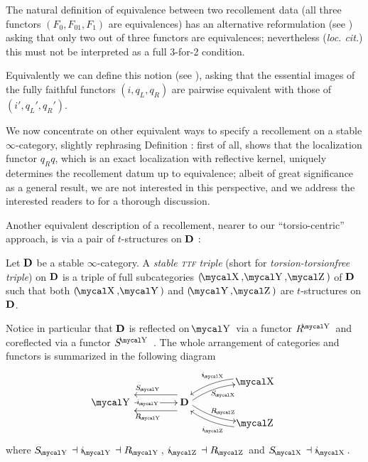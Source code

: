 \begin{remark}\label{equiv.of.reco}
The natural definition of equivalence between two recollement data (all three functors $(F_0, F_{01}, F_1)$ are equivalences) has an alternative reformulation (see \cite[ \textbf{2.5}]{parshall1988derived}) asking that only two out of three functors are equivalences; nevertheless (\emph{loc. cit.}) this must not be interpreted as a full 3-for-2 condition.

Equivalently we can define this notion (see \cite[\S \textbf{1.7}]{hugel2011recollements}), asking that the essential images of the fully faithful functors $(i, q_L,q_R)$ are pairwise equivalent with those of $(i', q_L', q_R')$.
\end{remark}
We now concentrate on other equivalent ways to specify a recollement on a stable $\infty$\hyp{}category, slightly rephrasing Definition : first of all, \cite[ \textbf{4.13.1}]{Hol} shows that the localization functor $q_Rq$, which is an exact localization with reflective kernel, uniquely determines the recollement datum up to equivalence; albeit of great significance as a general result, we are not interested in this perspective, and we address the interested readers to \cite{Hol} for a thorough discussion. 

Another equivalent description of a recollement, nearer to our ``torsio\hyp{}centric'' approach, is via a pair of $t$\hyp{}structures on $\textbf{D}$ \cite{ttftriples}:
\begin{definition}
Let $\textbf{D}$ be a stable $\infty$\hyp{}category. A \emph{stable \textsc{ttf} triple} (short for \emph{torsion\hyp{}torsionfree triple}) on $\textbf{D}$ is a triple of full subcategories $(\mcal{X}, \mcal{Y}, \mcal{Z})$ of $\textbf{D}$ such that both $(\mcal{X}, \mcal{Y})$ and $(\mcal{Y}, \mcal{Z})$ are $t$\hyp{}structures on $\textbf{D}$.
\end{definition}
Notice in particular that $\textbf{D}$ is reflected on $\mcal{Y}$ via a functor $R^{\mcal{Y}}$ and coreflected via a functor $S^{\mcal{Y}}$
. The whole arrangement of categories and functors is summarized in the following diagram
\[\label{ttf}
\xymatrix@C=1.5cm@R=2mm{
 	& 	& \mcal{X} \\
 \mcal{Y}	& \cate{D}	&  \\
 	& 	& \mcal{Z}
 \ar@/_8pt/@<-3pt> "1,3";"2,2" _{i_\mcal{X}}
 \ar "2,1";"2,2" |{i_\mcal{Y}}
 \ar@<8pt> "2,2";"2,1" ^{R_\mcal{Y}}
 \ar@<-8pt> "2,2";"2,1" _{S_\mcal{Y}}
 \ar@/^8pt/@<-3pt> "2,2";"1,3" _{S_\mcal{X}}
 \ar@/_8pt/@<3pt> "2,2";"3,3" ^{R_\mcal{Z}}
 \ar@/^8pt/@<3pt> "3,3";"2,2" ^{i_\mcal{Z}}
}
\]
where $S_{\mcal{Y}}\dashv i_\mcal{Y}\dashv R_\mcal{Y}$, $i_\mcal{Z}\dashv R_\mcal{Z}$ and $S_\mcal{X}\dashv i_\mcal{X}$. 

